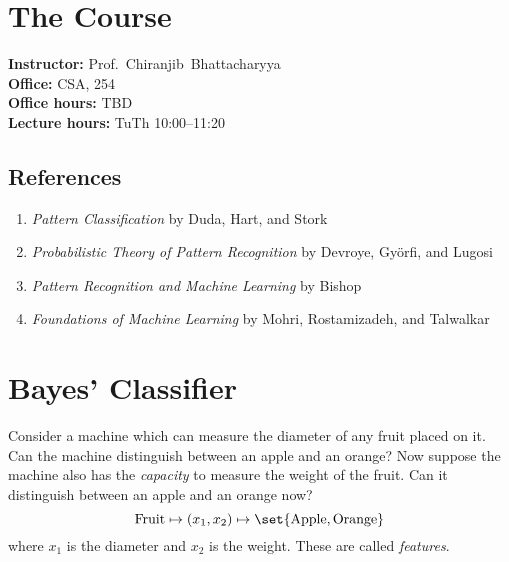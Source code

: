 \chapter*{The Course} \label{chp:course}
\textbf{Instructor:} Prof.~Chiranjib~Bhattacharyya \\
\textbf{Office:} CSA, 254 \\
\textbf{Office hours:} TBD\\
\textbf{Lecture hours:} TuTh 10:00--11:20

\section*{References} \label{sec:references}
\begin{enumerate}
    \item \textit{Pattern Classification} by Duda, Hart, and Stork
    \item \textit{Probabilistic Theory of Pattern Recognition} by Devroye,
        Györfi, and Lugosi
    \item \textit{Pattern Recognition and Machine Learning} by Bishop
    \item \textit{Foundations of Machine Learning} by Mohri, Rostamizadeh,
        and Talwalkar
\end{enumerate}

\chapter{Bayes' Classifier} \label{chp:bayes}
Consider a machine which can measure the diameter of any fruit placed on it.
Can the machine distinguish between an apple and an orange?
Now suppose the machine also has the \emph{capacity} to measure the weight
of the fruit.
Can it distinguish between an apple and an orange now?
\[
    \text{Fruit} \mapsto (x_1, x_2) \mapsto \set{\text{Apple}, \text{Orange}}
\] where $x_1$ is the diameter and $x_2$ is the weight.
These are called \emph{features}.

\begin{center}
\end{center}

